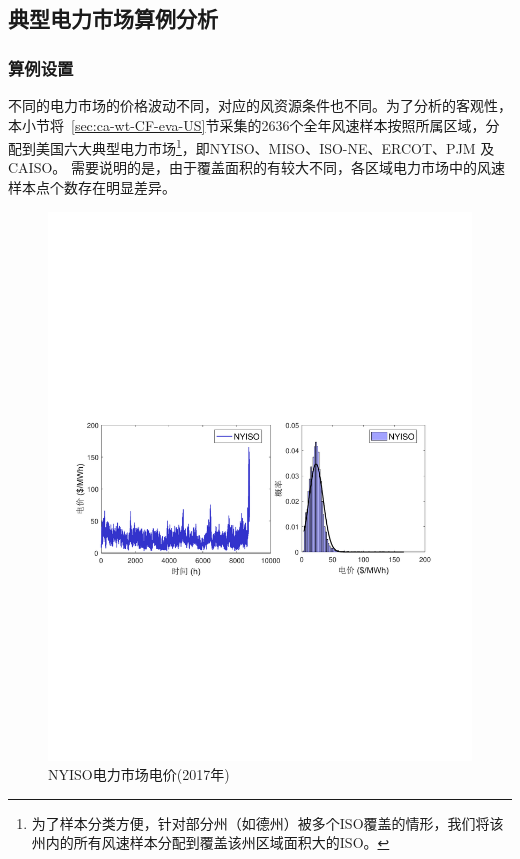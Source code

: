 \subsection{典型电力市场算例分析}

\subsubsection{算例设置}
不同的电力市场的价格波动不同，对应的风资源条件也不同。为了分析的客观性，本小节将~\ref{sec:ca-wt-CF-eva-US}节采集的2636个全年风速样本按照所属区域，分配到美国六大典型电力市场\footnote{为了样本分类方便，针对部分州（如德州）被多个ISO覆盖的情形，我们将该州内的所有风速样本分配到覆盖该州区域面积大的ISO。}，即NYISO、MISO、ISO-NE、ERCOT、PJM 及CAISO。 需要说明的是，由于覆盖面积的有较大不同，各区域电力市场中的风速样本点个数存在明显差异。

\begin{figure}[!htp] %
  \centering
  \includegraphics[scale=0.78]{figures/Chap5-15-Price-NYISO.pdf}
  \caption{NYISO电力市场电价(2017年)}
  \label{fig:Price-NYISO}
\end{figure}

